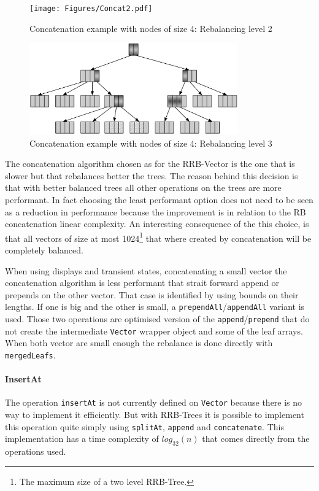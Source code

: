 \begin{figure}[h!]
  \centering
  \texttt{[image: Figures/Concat2.pdf]}
  \caption{Concatenation example with nodes of size 4: Rebalancing level 2}
  \label{Concat2Benchmarks}
\end{figure}

\begin{figure}[h!]
  \centering
  \includegraphics[width=0.8\textwidth]{Figures/Concat3.pdf}
  \caption{Concatenation example with nodes of size 4: Rebalancing level 3}
  \label{Concat3Benchmarks}
\end{figure}

The concatenation algorithm chosen as for the RRB-Vector is the one that is slower but that rebalances better the trees. The reason behind this decision is that with better balanced trees all other operations on the trees are more performant. In fact choosing the least performant option does not need to be seen as a reduction in performance because the improvement is in relation to the RB concatenation linear complexity. An interesting consequence of the this choice, is that all vectors of size at most 1024\footnote{The maximum size of a two level RRB-Tree.} that where created by concatenation will be completely balanced.

When using displays and transient states, concatenating a small vector the concatenation algorithm is less performant that strait forward append or prepends on the other vector. That case is identified by using bounds on their lengths. If one is big and the other is small, a \texttt{prependAll}/\texttt{appendAll} variant is used. Those two operations are optimised version of the \texttt{append}/\texttt{prepend} that do not create the intermediate \texttt{Vector} wrapper object and some of the leaf arrays. When both vector are small enough the rebalance is done directly with \texttt{mergedLeafs}.

\paragraph{InsertAt}
The operation \texttt{insertAt} is not currently defined on \texttt{Vector} because there is no way to implement it efficiently. But with RRB-Trees it is possible to implement this operation quite simply using \texttt{splitAt}, \texttt{append} and \texttt{concatenate}. This implementation has a time complexity of $log_{32}(n)$ that comes directly from the operations used.

